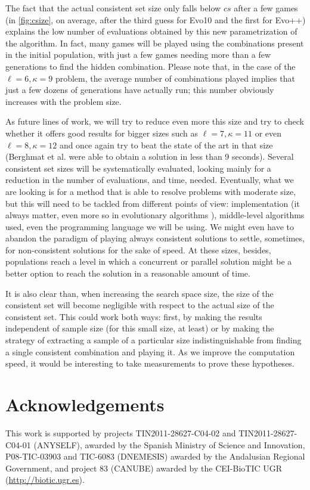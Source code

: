 \documentclass[conference]{IEEEtran}
\begin{document}
The fact that the actual consistent set size only falls below $cs$
after a few games (in \ref{fig:csize}, on average, after the third
guess for Evo10 and the first for Evo++)  explains the low number of
evaluations obtained by this new parametrization of the 
algorithm. In fact, many games will be played using the combinations
present in the initial population, with just a few games needing
more than a few generations to find the hidden combination. Please note that,
in the case of the $\ell=6,\kappa=9$ problem, the average number of combinations
played implies that just a few dozens of generations have actually
run; this number obviously increases with the problem size.

As future lines of work, we will try to reduce even more this size and
try to check whether it offers good results for bigger sizes such as
$\ell=7,\kappa=11$ or even $\ell=8,\kappa=12$ and once again try to
beat the state of the art in that size (Berghmat et al. were able to
obtain a solution in less than 9 seconds).  Several consistent set
sizes will be systematically evaluated, looking mainly for a reduction
in the number of evaluations, and time, needed. Eventually, what we
are looking is for a method that is able to resolve problems with
moderate size, but this will need to be tackled from different points
of view: implementation (it always matter, even more so in evolutionary
algorithms \cite{DBLP:conf/iwann/MereloRACML11}), middle-level algorithms
used, even the programming language we will be using. We might even
have to abandon the paradigm of playing always consistent solutions to
settle, sometimes, for non-consistent solutions for the sake of
speed. At these sizes, besides, populations reach a level in which a
concurrent or parallel solution might be a better option to reach the
solution in a reasonable amount of time. 

It is also clear than, when increasing the search space size, the size
of the consistent set will become negligible with respect to the
actual size of the consistent set. This could work both ways: first,
by making the results independent of sample size (for this small size,
at least) or by making the strategy of extracting a sample of a
particular size indistinguishable from finding a single consistent
combination and playing it. As we improve the computation speed, it
would be interesting to take measurements to prove these hypotheses. 

\section*{Acknowledgements}
This work is supported by projects 
TIN2011-28627-C04-02 and TIN2011-28627-C04-01 (ANYSELF), awarded by the Spanish
Ministry of Science and Innovation, P08-TIC-03903 and TIC-6083
(DNEMESIS) awarded by the Andalusian Regional Government, and project
83 (CANUBE) awarded by the CEI-BioTIC UGR
(\url{http://biotic.ugr.es}). 
\end{document}
